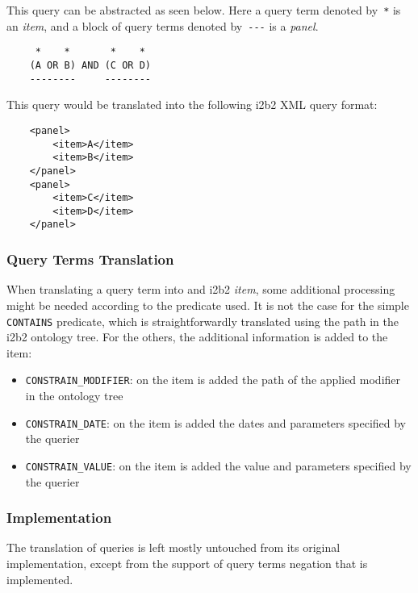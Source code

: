 \begin{samepage}
This query can be abstracted as seen below.
Here a query term denoted by~\verb|*| is an \emph{item}, and a block of query terms denoted by~\verb|---| is a \emph{panel}.
\begin{verbatim}
     *    *       *    *
    (A OR B) AND (C OR D)
    --------     --------
\end{verbatim}
\end{samepage}

\begin{samepage}
This query would be translated into the following i2b2 XML query format:
\begin{verbatim}
    <panel>
        <item>A</item>
        <item>B</item>
    </panel>
    <panel>
        <item>C</item>
        <item>D</item>
    </panel>
\end{verbatim}
\end{samepage}


\subsubsection{Query Terms Translation}

When translating a query term into and i2b2 \emph{item}, some additional processing might be needed according to the predicate used.
It is not the case for the simple \verb|CONTAINS| predicate, which is straightforwardly translated using the path in the i2b2 ontology tree.
For the others, the additional information is added to the item:

\begin{samepage}
\begin{itemize}
    \item \verb|CONSTRAIN_MODIFIER|: on the item is added the path of the applied modifier in the ontology tree
    \item \verb|CONSTRAIN_DATE|: on the item is added the dates and parameters specified by the querier
    \item \verb|CONSTRAIN_VALUE|: on the item is added the value and parameters specified by the querier
\end{itemize}
\end{samepage}


\subsubsection*{Implementation}

The translation of queries is left mostly untouched from its original implementation, except from the support of query terms negation that is implemented.


